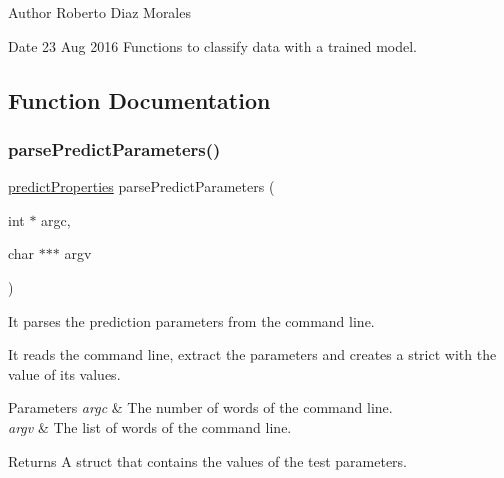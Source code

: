 \begin{DoxyAuthor}{Author}
Roberto Diaz Morales 
\end{DoxyAuthor}
\begin{DoxyDate}{Date}
23 Aug 2016 Functions to classify data with a trained model. 
\end{DoxyDate}


\subsection{Function Documentation}
\hypertarget{LIBIRWLS-predict_8h_a186e63263bf147110137e90adafcb8c7}{}\label{LIBIRWLS-predict_8h_a186e63263bf147110137e90adafcb8c7} 
\subsubsection{\texorpdfstring{parse\+Predict\+Parameters()}{parsePredictParameters()}}
{\ttfamily \hyperlink{structpredictProperties}{predict\+Properties} parse\+Predict\+Parameters (\begin{DoxyParamCaption}\item[{int $\ast$}]{argc,  }\item[{char $\ast$$\ast$$\ast$}]{argv }\end{DoxyParamCaption})}



It parses the prediction parameters from the command line. 

It reads the command line, extract the parameters and creates a strict with the value of its values. 
\begin{DoxyParams}{Parameters}
{\em argc} & The number of words of the command line. \\
\hline
{\em argv} & The list of words of the command line. \\
\hline
\end{DoxyParams}
\begin{DoxyReturn}{Returns}
A struct that contains the values of the test parameters. 
\end{DoxyReturn}
\hypertarget{LIBIRWLS-predict_8h_a53efcb64ca8e76d4a2cb65991189af91}{}\label{LIBIRWLS-predict_8h_a53efcb64ca8e76d4a2cb65991189af91} 
